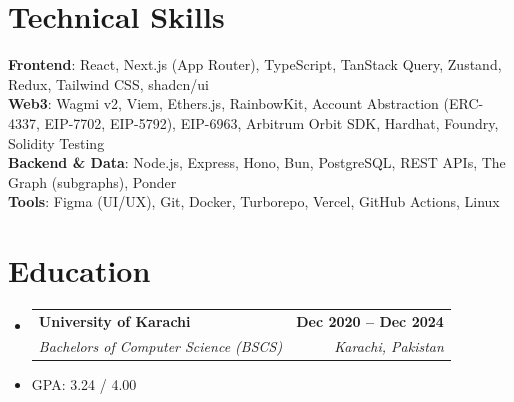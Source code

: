 \documentclass[letterpaper,11pt]{article}
\makeatletter
\newcommand{\resumeItem}[1]{
  \item\small{
    {#1 \vspace{0pt}}
  }
}
\newcommand{\resumeSubheading}[4]{
  \vspace{-2pt}\item
    \begin{tabular*}{1.0\textwidth}[t]{l@{\extracolsep{\fill}}r}
      \textbf{#1} & \textbf{\small #2} \\
      \textit{\small#3} & \textit{\small #4} \\
    \end{tabular*}\vspace{-7pt}
}
\newcommand{\resumeSubHeadingListStart}{\begin{itemize}[leftmargin=0.0in, label={}]}
\newcommand{\resumeSubHeadingListEnd}{\end{itemize}}\vspace{0pt}
\newcommand{\resumeItemListStart}{\begin{itemize}}
\newcommand{\resumeItemListEnd}{\end{itemize}\vspace{-5pt}}
\makeatother
\begin{document}
\section{Technical Skills}
 \begin{itemize}[leftmargin=0.23in, label={}]
    \small{\item{
     \textbf{Frontend}{: React, Next.js (App Router), TypeScript, TanStack Query, Zustand, Redux, Tailwind CSS, shadcn/ui} \\[1mm]
     \textbf{Web3}{: Wagmi v2, Viem, Ethers.js, RainbowKit, Account Abstraction (ERC-4337, EIP-7702, EIP-5792), EIP-6963, Arbitrum Orbit SDK, Hardhat, Foundry, Solidity Testing} \\[1mm]
     \textbf{Backend \& Data}{: Node.js, Express, Hono, Bun, PostgreSQL, REST APIs, The Graph (subgraphs), Ponder} \\[1mm]
     \textbf{Tools}{: Figma (UI/UX), Git, Docker, Turborepo, Vercel, GitHub Actions, Linux} \\[1mm]
    }}
 \end{itemize}
 \vspace{-10pt}

\section{Education}
  \resumeSubHeadingListStart
    \resumeSubheading
      {University of Karachi}{Dec 2020 -- Dec 2024}
      {Bachelors of Computer Science (BSCS)}{Karachi, Pakistan}
  \resumeSubHeadingListEnd
    \resumeItemListStart
        \resumeItem {GPA: 3.24 / 4.00}
    \resumeItemListEnd
\end{document}
